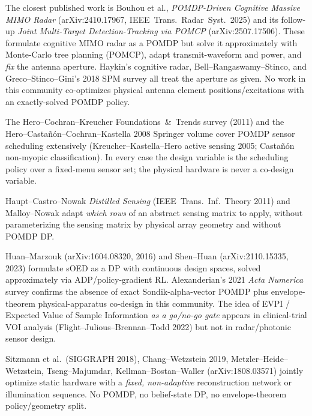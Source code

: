 \documentclass[11pt,a4paper]{article}
\begin{document}
\begin{description}[leftmargin=2em, style=nextline]
\item[Cognitive radar.]
The closest published work is Bouhou et al., \emph{POMDP-Driven Cognitive Massive MIMO Radar} (arXiv:2410.17967, IEEE~Trans.~Radar~Syst.\ 2025) and its follow-up \emph{Joint Multi-Target Detection-Tracking via POMCP} (arXiv:2507.17506).  These formulate cognitive MIMO radar as a POMDP but solve it approximately with Monte-Carlo tree planning (POMCP), adapt transmit-waveform and power, and \emph{fix} the antenna aperture.  Haykin's cognitive radar, Bell--Rangaswamy--Stinco, and Greco--Stinco--Gini's 2018 SPM survey all treat the aperture as given.  No work in this community co-optimizes physical antenna element positions/excitations with an exactly-solved POMDP policy.

\item[Sensor management.]
The Hero--Cochran--Kreucher Foundations~\&~Trends survey (2011) and the Hero--Casta\~n\'on--Cochran--Kastella 2008 Springer volume cover POMDP sensor scheduling extensively (Kreucher--Kastella--Hero active sensing 2005; Casta\~n\'on non-myopic classification).  In every case the design variable is the scheduling policy over a fixed-menu sensor set; the physical hardware is never a co-design variable.

\item[Adaptive compressed sensing.]
Haupt--Castro--Nowak \emph{Distilled Sensing} (IEEE~Trans.~Inf.~Theory 2011) and Malloy--Nowak adapt \emph{which rows} of an abstract sensing matrix to apply, without parameterizing the sensing matrix by physical array geometry and without POMDP DP.

\item[Sequential Bayesian DoE.]
Huan--Marzouk (arXiv:1604.08320, 2016) and Shen--Huan (arXiv:2110.15335, 2023) formulate sOED as a DP with continuous design spaces, solved approximately via ADP/policy-gradient RL.  Alexanderian's 2021 \emph{Acta Numerica} survey confirms the absence of exact Sondik-alpha-vector POMDP plus envelope-theorem physical-apparatus co-design in this community.  The idea of EVPI / Expected Value of Sample Information \emph{as a go/no-go gate} appears in clinical-trial VOI analysis (Flight--Julious--Brennan--Todd 2022) but not in radar/photonic sensor design.

\item[End-to-end optics co-design.]
Sitzmann et al.\ (SIGGRAPH 2018), Chang--Wetzstein 2019, Metzler--Heide--Wetzstein, Tseng--Majumdar, Kellman--Bostan--Waller (arXiv:1808.03571) jointly optimize static hardware with a \emph{fixed, non-adaptive} reconstruction network or illumination sequence.  No POMDP, no belief-state DP, no envelope-theorem policy/geometry split.


\end{description}
\end{document}
